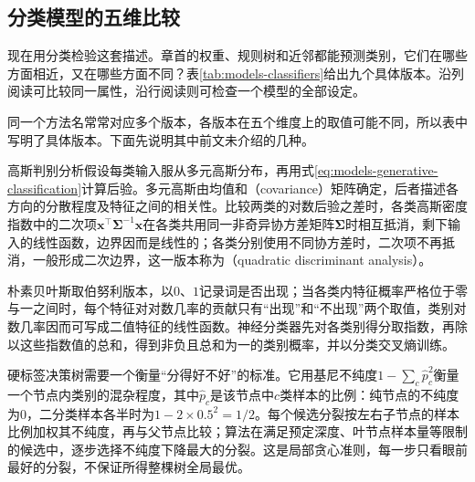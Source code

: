 \subsection{分类模型的五维比较}
\label{sec:models-classification-grid}

现在用分类检验这套描述。章首的权重、规则树和近邻都能预测类别，它们在哪些方面相近，又在哪些方面不同？表\ref{tab:models-classifiers}给出九个具体版本。沿列阅读可比较同一属性，沿行阅读则可检查一个模型的全部设定。

同一个方法名常常对应多个版本，各版本在五个维度上的取值可能不同，所以表中写明了具体版本。下面先说明其中前文未介绍的几种。

高斯判别分析假设每类输入服从多元高斯分布，再用式\eqref{eq:models-generative-classification}计算后验。多元高斯由均值和（covariance）矩阵确定，后者描述各方向的分散程度及特征之间的相关性。比较两类的对数后验之差时，各类高斯密度指数中的二次项$\bm{x}^{\top}\bm{\Sigma}^{-1}\bm{x}$在各类共用同一非奇异协方差矩阵$\bm{\Sigma}$时相互抵消，剩下输入的线性函数，边界因而是线性的；各类分别使用不同协方差时，二次项不再抵消，一般形成二次边界，这一版本称为（quadratic discriminant analysis）。

朴素贝叶斯取伯努利版本，以$0$、$1$记录词是否出现；当各类内特征概率严格位于零与一之间时，每个特征对对数几率的贡献只有“出现”和“不出现”两个取值，类别对数几率因而可写成二值特征的线性函数。神经分类器先对各类别得分取指数，再除以这些指数值的总和，得到非负且总和为一的类别概率，并以分类交叉熵训练。

硬标签决策树需要一个衡量“分得好不好”的标准。它用基尼不纯度$1-\sum_c\hat p_c^2$衡量一个节点内类别的混杂程度，其中$\hat p_c$是该节点中$c$类样本的比例：纯节点的不纯度为$0$，二分类样本各半时为$1-2\times0.5^2=1/2$。每个候选分裂按左右子节点的样本比例加权其不纯度，再与父节点比较；算法在满足预定深度、叶节点样本量等限制的候选中，逐步选择不纯度下降最大的分裂。这是局部贪心准则，每一步只看眼前最好的分裂，不保证所得整棵树全局最优。

